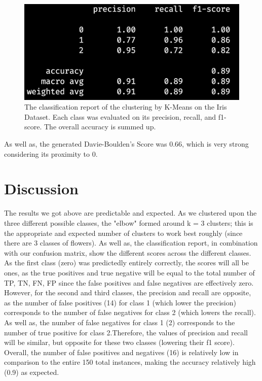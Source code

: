 \documentclass[10pt,twocolumn]{article}
\begin{document}
\begin{figure}[h!]
  \centering
  \includegraphics[scale=0.3]{class_report_iris.png}
  \vspace{20px}
  \caption{The classification report of the clustering by K-Means on the Iris Dataset. Each class was evaluated on its precision, recall, and f1-score. The overall accuracy is summed up.}
  \label{class_report_iris}
\end{figure}

As well as, the generated Davie-Boulden's Score was 0.66, which is very strong considering its proximity to 0.

\section {Discussion}



The results we got above are predictable and expected. As we clustered upon the three different possible classes, the "elbow" formed around k = 3 clusters; this is the appropriate and expected number of clusters to work best roughly (since there are 3 classes of flowers). As well as, the classification report, in combination with our confusion matrix, show the different scores across the different classes. As the first class (zero) was predictedly entirely correctly, the scores will all be ones, as the true positives and true negative will be equal to the total number of TP, TN, FN, FP since the false positives and false negatives are effectively zero. However, for the second and third classes, the precision and recall are opposite, as the number of false positives (14) for class 1 (which lower the precision) corresponds to the number of false negatives for class 2 (which lowers the recall). As well as, the number of false negatives for class 1 (2) corresponds to the number of true positive for class 2.Therefore, the values of precision and recall will be similar, but opposite for these two classes (lowering their f1 score). Overall, the number of false positives and negatives (16) is relatively low in comparison to the entire 150 total instances, making the accuracy relatively high (0.9) as expected.
\end{document}
